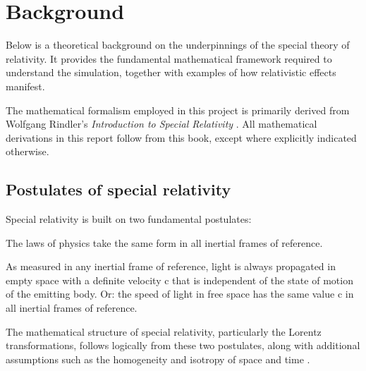 \documentclass[a4paper]{article}
\begin{document}



\section{Background}

Below is a theoretical background on the underpinnings of the special theory of relativity. It provides the fundamental mathematical framework required to understand the simulation, together with examples of how relativistic effects manifest.

The mathematical formalism employed in this project is primarily derived from Wolfgang Rindler's \textit{Introduction to Special Relativity} \cite{rindler}. All mathematical derivations in this report follow from this book, except where explicitly indicated otherwise. 

\subsection{Postulates of special relativity}

Special relativity is built on two fundamental postulates:

\begin{postulate}
    The laws of physics take the same form in all inertial frames of reference.
\end{postulate}

\begin{postulate}
    As measured in any inertial frame of reference, light is always propagated in empty space with a definite velocity c that is independent of the state of motion of the emitting body. Or: the speed of light in free space has the same value c in all inertial frames of reference.
\end{postulate}

\noindent
The mathematical structure of special relativity, particularly the Lorentz transformations, follows logically from these two postulates, along with additional assumptions such as the homogeneity and isotropy of space and time \cite{postulates}.
\end{document}
